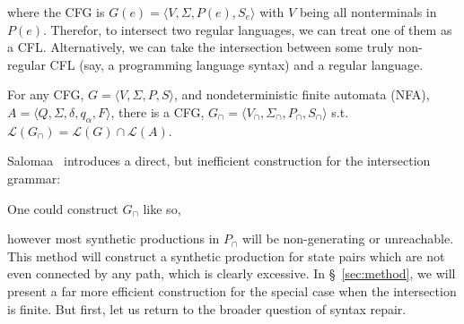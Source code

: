 \documentclass[sigplan,review,acmsmall,nonacm,screen,anonymous]{acmart}\settopmatter{printfolios=false,printccs=false,printacmref=false}
\begin{document}
\noindent where the CFG is $G(e) = \langle V, \Sigma, P(e), S_e\rangle$ with $V$ being all nonterminals in $P(e)$. Therefor, to intersect two regular languages, we can treat one of them as a CFL. Alternatively, we can take the intersection between some truly non-regular CFL (say, a programming language syntax) and a regular language.

\begin{theorem}
  For any CFG, $G = \langle V, \Sigma, P, S\rangle$, and nondeterministic finite automata (NFA), $A = \langle Q, \Sigma, \delta, q_\alpha, F\rangle$, there is a CFG, \(G_\cap=\langle V_\cap, \Sigma_\cap, P_\cap, S_\cap\rangle\) s.t. $\mathcal{L}(G_\cap) = \mathcal{L}(G)\cap\mathcal{L}(A)$.
\end{theorem}

\noindent Salomaa~\cite{salomaa1973formal} introduces a direct, but inefficient construction for the intersection grammar:

\begin{definition}[Salomaa, 1973]
  One could construct $G_\cap$ like so,

  \noindent{}
\end{definition}\vspace{0.2cm}

\noindent however most synthetic productions in $P_\cap$ will be non-generating or unreachable. This method will construct a synthetic production for state pairs which are not even connected by any path, which is clearly excessive. In \S~\ref{sec:method}, we will present a far more efficient construction for the special case when the intersection is finite. But first, let us return to the broader question of syntax repair.%
\end{document}
